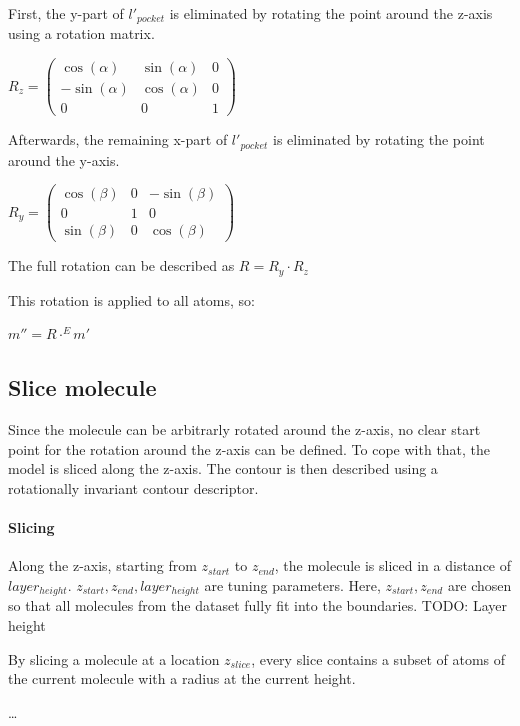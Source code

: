 First, the y-part of $l'_{pocket}$ is eliminated by rotating the point around the z-axis using a rotation matrix.

$
R_z =
\begin{pmatrix}
  \cos(\alpha) & \sin(\alpha) & 0 \\
  -\sin(\alpha) & \cos(\alpha) & 0 \\
  0 & 0 & 1
\end{pmatrix}
$

Afterwards, the remaining x-part of $l'_{pocket}$ is eliminated by rotating the point around the y-axis.

$
R_y =
\begin{pmatrix}
  \cos(\beta) & 0 & -\sin(\beta) \\
  0 & 1 & 0 \\
  \sin(\beta) & 0 & \cos(\beta) 
\end{pmatrix}
$

The full rotation can be described as $R = R_y \cdot R_z$

This rotation is applied to all atoms, so:

$m'' = R \cdot^E m'$


\subsection{Slice molecule}

Since the molecule can be arbitrarly rotated around the z-axis, no clear start point for the rotation around the z-axis can be defined.
To cope with that, the model is sliced along the z-axis. 
The contour is then described using a rotationally invariant contour descriptor.

\paragraph{Slicing}

Along the z-axis, starting from $z_{start}$ to $z_{end}$, the molecule is sliced in a distance of $layer_{height}$.
$z_{start}, z_{end}, layer_{height}$ are tuning parameters. 
Here, $z_{start}, z_{end}$ are chosen so that all molecules from the dataset fully fit into the boundaries.
TODO: Layer height %

By slicing a molecule at a location $z_{slice}$, every slice contains a subset of atoms of the current molecule with a radius at the current height.

\dots

